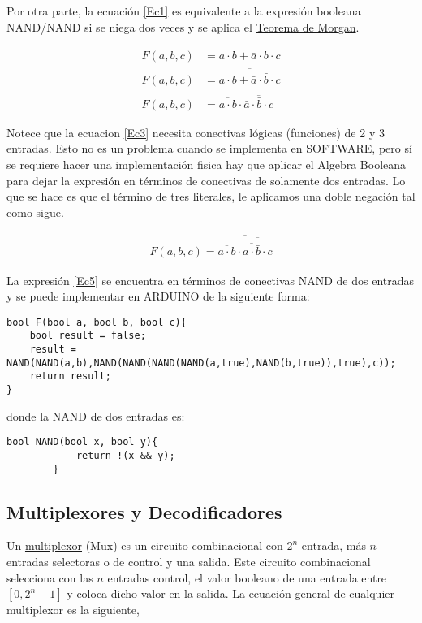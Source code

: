 Por otra parte, la ecuación \eqref{Ec1} es equivalente a la expresión booleana  NAND/NAND si se niega dos veces y se aplica el \href{https://es.wikipedia.org/wiki/Leyes_de_De_Morgan}{Teorema de Morgan}.


\begin{align}
\label{Ec2}
F(a,b,c)&=a\cdot b+\bar{a}\cdot \bar{b} \cdot c \\
F(a,b,c)&=\overline{\overline{a\cdot b+\bar{a}\cdot \bar{b}\cdot c}} \\  \label{Ec3}
F(a,b,c)&=\overline{\overline{a\cdot b}\cdot\overline{\bar{a}\cdot \bar{b}\cdot c}}
\end{align}


Notece que la ecuacion \eqref{Ec3} necesita conectivas lógicas (funciones) de 2 y 3 entradas. Esto no es un problema cuando se implementa en SOFTWARE, pero sí se requiere hacer una implementación fisica hay que aplicar el Algebra Booleana para dejar la expresión en términos de conectivas de solamente dos entradas. Lo que se hace es que el término de tres literales, le aplicamos una doble negación tal como sigue.

\begin{eqnarray}
\label{Ec5}
F(a,b,c)=\overline{\overline{a\cdot b}\cdot\overline{\overline{\overline{\bar{a}\cdot \bar{b}}}\cdot c}} 
\end{eqnarray}

La expresión \eqref{Ec5} se encuentra en términos de conectivas NAND de dos entradas y se puede implementar en ARDUINO  de la siguiente forma:
{\footnotesize 
\begin{lstlisting}[language=Arduino,numbers=none, showstringspaces=false]
bool F(bool a, bool b, bool c){
	bool result = false;
	result = NAND(NAND(a,b),NAND(NAND(NAND(NAND(a,true),NAND(b,true)),true),c));
	return result;
}
\end{lstlisting} 
}
donde la NAND de dos entradas es:

		\begin{lstlisting}[language=Arduino,numbers=none, showstringspaces=false]
		bool NAND(bool x, bool y){
			return !(x && y);
		}
		\end{lstlisting}

\subsection{Multiplexores y Decodificadores}

Un \href{https://es.wikipedia.org/wiki/Multiplexor}{multiplexor} (Mux) es un circuito combinacional con $2^{n}$ entrada, más $n$  entradas selectoras o de control y una salida. Este circuito combinacional selecciona con las $n$ entradas control,  el valor booleano de una entrada entre $\left[ 0,2^{n}-1\right]$ y coloca dicho valor en la salida. La ecuación general de cualquier multiplexor es la siguiente,

